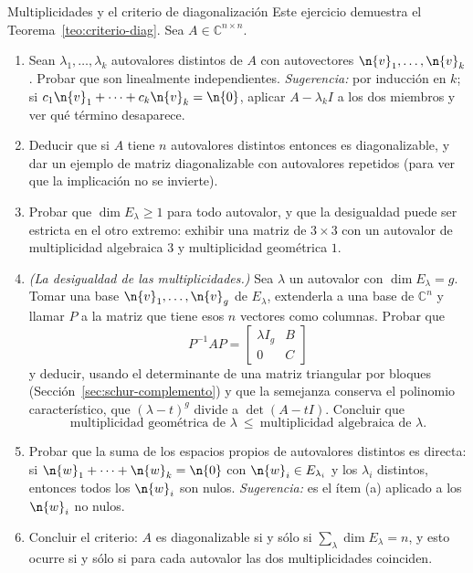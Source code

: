 \begin{entrega}{Multiplicidades y el criterio de diagonalización}\label{ent:multiplicidades}
Este ejercicio demuestra el Teorema~\ref{teo:criterio-diag}. Sea
$A\in\mathbb{C}^{n\times n}$.

\begin{enumerate}[label=\textbf{(\alph*)},itemsep=3pt,topsep=4pt]
\item Sean $\lambda_1,\dots,\lambda_k$ autovalores distintos de $A$ con autovectores
$\n{v}_1,\dots,\n{v}_k$. Probar que son linealmente independientes.
\emph{Sugerencia:} por inducción en $k$; si
$c_1\n{v}_1+\cdots+c_k\n{v}_k=\n{0}$, aplicar $A-\lambda_kI$ a los dos miembros y ver
qué término desaparece.

\item Deducir que si $A$ tiene $n$ autovalores distintos entonces es diagonalizable, y
dar un ejemplo de matriz diagonalizable con autovalores repetidos (para ver que la
implicación no se invierte).

\item Probar que $\dim E_\lambda\ge1$ para todo autovalor, y que la desigualdad puede
ser estricta en el otro extremo: exhibir una matriz de $3\times3$ con un autovalor de
multiplicidad algebraica $3$ y multiplicidad geométrica $1$.

\item \emph{(La desigualdad de las multiplicidades.)} Sea $\lambda$ un autovalor con
$\dim E_\lambda=g$. Tomar una base $\n{v}_1,\dots,\n{v}_g$ de $E_\lambda$, extenderla a
una base de $\mathbb{C}^n$ y llamar $P$ a la matriz que tiene esos $n$ vectores como
columnas. Probar que
\[
P^{-1}AP=\begin{bmatrix}\lambda I_g & B\\ 0 & C\end{bmatrix}
\]
y deducir, usando el determinante de una matriz triangular por bloques
(Sección~\ref{sec:schur-complemento}) y que la semejanza conserva el polinomio
característico, que $(\lambda-t)^g$ divide a $\det(A-tI)$. Concluir que
\[
\text{multiplicidad geométrica de }\lambda\ \le\ \text{multiplicidad algebraica de }\lambda .
\]

\item Probar que la suma de los espacios propios de autovalores distintos es directa:
si $\n{w}_1+\cdots+\n{w}_k=\n{0}$ con $\n{w}_i\in E_{\lambda_i}$ y los $\lambda_i$
distintos, entonces todos los $\n{w}_i$ son nulos. \emph{Sugerencia:} es el ítem (a)
aplicado a los $\n{w}_i$ no nulos.

\item Concluir el criterio: $A$ es diagonalizable si y sólo si
$\sum_\lambda \dim E_\lambda = n$, y esto ocurre si y sólo si para cada autovalor las
dos multiplicidades coinciden.


\end{enumerate}
\end{entrega}
